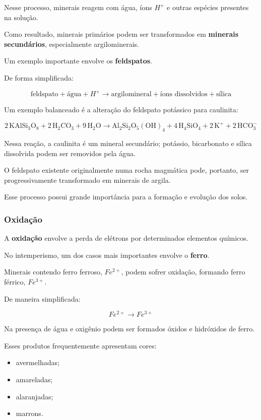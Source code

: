 Nesse processo, minerais reagem com água, íons \(H^+\) e outras espécies presentes na solução.

Como resultado, minerais primários podem ser transformados em \textbf{minerais secundários}, especialmente argilominerais.

Um exemplo importante envolve os \textbf{feldspatos}.

De forma simplificada:

\[
\text{feldspato}
+
\text{água}
+
H^+
\rightarrow
\text{argilomineral}
+
\text{íons dissolvidos}
+
\text{sílica}
\]

Um exemplo balanceado é a alteração do feldspato potássico para caulinita:

\[
\mathrm{
2\,KAlSi_3O_8 + 2\,H_2CO_3 + 9\,H_2O
\rightarrow
Al_2Si_2O_5(OH)_4 + 4\,H_4SiO_4 + 2\,K^+ + 2\,HCO_3^-
}
\]

Nessa reação, a caulinita é um mineral secundário; potássio, bicarbonato e sílica dissolvida podem ser removidos pela água.

O feldspato existente originalmente numa rocha magmática pode, portanto, ser progressivamente transformado em minerais de argila.

Esse processo possui grande importância para a formação e evolução dos solos.

\subsubsection{Oxidação}

A \textbf{oxidação} envolve a perda de elétrons por determinados elementos químicos.

No intemperismo, um dos casos mais importantes envolve o \textbf{ferro}.

Minerais contendo ferro ferroso, \(Fe^{2+}\), podem sofrer oxidação, formando ferro férrico, \(Fe^{3+}\).

De maneira simplificada:

\[
Fe^{2+}
\rightarrow
Fe^{3+}
\]

Na presença de água e oxigênio podem ser formados óxidos e hidróxidos de ferro.

Esses produtos frequentemente apresentam cores:

\begin{itemize}
    \item avermelhadas;
    \item amareladas;
    \item alaranjadas;
    \item marrons.
\end{itemize}

